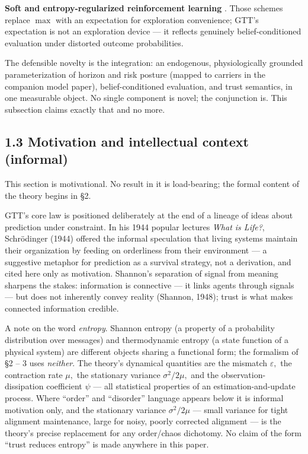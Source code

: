 \documentclass[11pt,twocolumn]{article}
\theoremstyle{gttdef}
\theoremstyle{gttplain}
\begin{document}
\textbf{Soft and entropy-regularized reinforcement learning} \citep{ziebart2008,haarnoja2017}. Those schemes replace $\max$ with an expectation for exploration convenience; GTT's expectation is not an exploration device --- it reflects genuinely belief-conditioned evaluation under distorted outcome probabilities.

The defensible novelty is the integration: an endogenous, physiologically grounded parameterization of horizon and risk posture (mapped to carriers in the companion model paper), belief-conditioned evaluation, and trust semantics, in one measurable object. No single component is novel; the conjunction is. This subsection claims exactly that and no more.

\subsection*{1.3 Motivation and intellectual context (informal)}

This section is motivational. No result in it is load-bearing; the formal content of the theory begins in \S{}2.

GTT's core law is positioned deliberately at the end of a lineage of ideas about prediction under constraint. In his 1944 popular lectures \emph{What is Life?}, Schrödinger (1944) offered the informal speculation that living systems maintain their organization by feeding on orderliness from their environment --- a suggestive metaphor for prediction as a survival strategy, not a derivation, and cited here only as motivation. Shannon's separation of signal from meaning sharpens the stakes: information is connective --- it links agents through signals --- but does not inherently convey reality (Shannon, 1948); trust is what makes connected information credible.

A note on the word \emph{entropy}. Shannon entropy (a property of a probability distribution over messages) and thermodynamic entropy (a state function of a physical system) are different objects sharing a functional form; the formalism of \S{}2 -- 3 uses \emph{neither}. The theory's dynamical quantities are the mismatch $\varepsilon,$ the contraction rate $\mu,$ the stationary variance $\sigma^{2}/2\mu,$ and the observation-dissipation coefficient $\psi$ --- all statistical properties of an estimation-and-update process. Where ``order'' and ``disorder'' language appears below it is informal motivation only, and the stationary variance $\sigma^{2}/2\mu$ --- small variance for tight alignment maintenance, large for noisy, poorly corrected alignment --- is the theory's precise replacement for any order/chaos dichotomy. No claim of the form ``trust reduces entropy'' is made anywhere in this paper.
\end{document}
